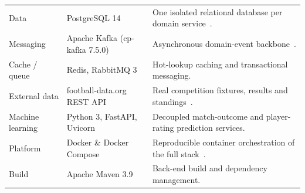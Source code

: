 \begin{longtable}{p{} p{} p{}}
Data & PostgreSQL 14 & One isolated relational database per domain service~\cite{postgres}. \\
Messaging & Apache Kafka (cp-kafka 7.5.0) & Asynchronous domain-event backbone~\cite{kafka}. \\
Cache / queue & Redis, RabbitMQ 3 & Hot-lookup caching and transactional messaging. \\
External data & football-data.org REST API & Real competition fixtures, results and standings~\cite{footballdata,restapi}. \\
Machine learning & Python 3, FastAPI, Uvicorn & Decoupled match-outcome and player-rating prediction services. \\
Platform & Docker \& Docker Compose & Reproducible container orchestration of the full stack~\cite{docker}. \\
Build & Apache Maven 3.9 & Back-end build and dependency management. \\
\end{longtable}
\renewcommand{\arraystretch}{1.0}

